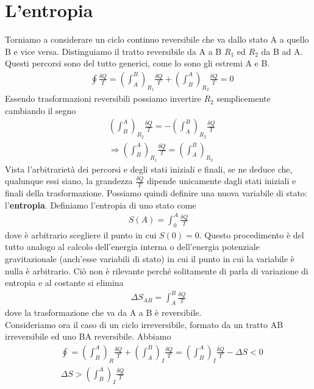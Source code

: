 \documentclass[10pt,a4paper]{article}
\begin{document}
\section{L'entropia}
Torniamo a considerare un ciclo continuo reversibile che va dallo stato A a quello B e vice versa. Distinguiamo il tratto reversibile da A a B \(R_1\) ed \(R_2\) da B ad A. Questi percorsi sono del tutto generici, come lo sono gli estremi A e B. 
\begin{align*}
	&\oint \frac{\delta Q}{T} = \left(\int_A^B\right)_{R_1} \frac{\delta Q}{T} + \left(\int_B^A\right)_{R_2} \frac{\delta Q}{T} = 0
\end{align*}
Essendo trasformazioni reversibili possiamo invertire \(R_2\) semplicemente cambiando il segno
\begin{align*}
	&\left(\int_B^A\right)_{R_2}  \frac{\delta Q}{T} = -\left(\int_A^B\right)_{R_2}  \frac{\delta Q}{T}\\
	&\Rightarrow \left(\int_B^A\right)_{R_1}  \frac{\delta Q}{T} = \left(\int_A^B\right)_{R_2} 
\end{align*}
Vista l'arbitrarietà dei percorsi e degli stati iniziali e finali, se ne deduce che, qualunque essi siano, la grandezza \(\frac{\delta Q}{T}\) dipende unicamente dagli stati iniziali e finali della trasformazione. Possiamo quindi definire una nuova variabile di stato: l'\textbf{entropia}. Definiamo l'entropia di uno stato come 
\begin{align*}
	S(A) = \int_0^A \frac{\delta Q}{T}
\end{align*}
dove è arbitrario scegliere il punto in cui \(S(0)=0\). Questo procedimento è del tutto analogo al calcolo dell'energia interna o dell'energia potenziale gravitazionale (anch'esse variabili di stato) in cui il punto in cui la variabile è nulla è arbitrario. Ciò non è rilevante perché solitamente di parla di variazione di entropia e al costante si elimina
\begin{align*}
	\Delta S_{AB} = \int_A^B \frac{\delta Q}{T}
\end{align*}
dove la trasformazione che va da A a B è reversibile.\\
Consideriamo ora il caso di un ciclo irreversibile, formato da un tratto AB irreversibile ed uno BA reversibile. Abbiamo
\begin{align*}
	&\oint =\left( \int_B^A\right)_R \frac{\delta Q}{T} + \left(\int_A^B\right)_I \frac{\delta Q}{T}=\left(\int_B^A \right)_I \frac{\delta Q}{T} - \Delta S < 0\\
	&\Delta S > \left(\int_B^A\right)_I \frac{\delta Q}{T}\\
\end{align*}
\end{document}
